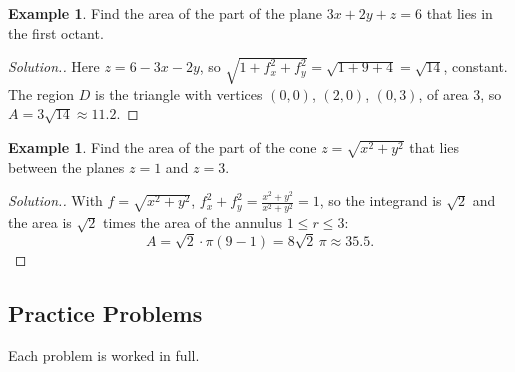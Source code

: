 \documentclass[11pt,a4paper]{article}
\theoremstyle{definition}
\newtheorem{exa}[thm]{Example}
\newenvironment{solution}
  {\renewcommand{\qedsymbol}{}\begin{proof}[\textit{Solution}.]}
  {\end{proof}}
\begin{document}
\begin{exa}
\label{ex:planearea}
Find the area of the part of the plane $3x + 2y + z = 6$ that lies in the first
octant.
\end{exa}

\begin{solution}
Here $z = 6 - 3x - 2y$, so $\sqrt{1 + f_x^2 + f_y^2} = \sqrt{1 + 9 + 4} =
\sqrt{14}$, constant. The region $D$ is the triangle with vertices $(0,0)$,
$(2,0)$, $(0,3)$, of area $3$, so $A = 3\sqrt{14}\approx 11.2$.
\end{solution}

\begin{exa}
\label{ex:conearea}
Find the area of the part of the cone $z = \sqrt{x^2 + y^2}$ that lies between
the planes $z = 1$ and $z = 3$.
\end{exa}

\begin{solution}
With $f = \sqrt{x^2 + y^2}$, $f_x^2 + f_y^2 = \frac{x^2 + y^2}{x^2 + y^2} = 1$, so
the integrand is $\sqrt 2$ and the area is $\sqrt 2$ times the area of the
annulus $1\leq r\leq 3$:
\[A = \sqrt2\cdot\pi(9 - 1) = 8\sqrt2\,\pi\approx 35.5 .\]
\end{solution}


\subsection{Practice Problems}

Each problem is worked in full.
\end{document}
